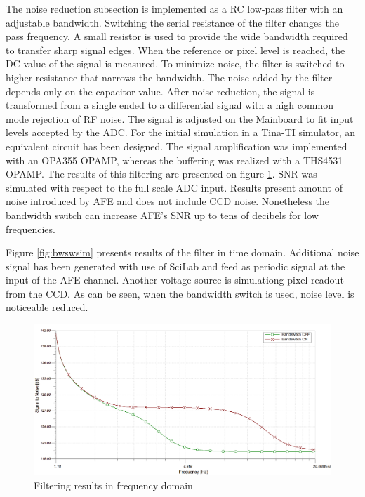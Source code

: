 The noise reduction subsection is implemented as a RC low-pass filter with an adjustable bandwidth. Switching the serial resistance of the filter changes the pass frequency. A small resistor is used to provide the wide bandwidth required to transfer sharp signal edges. When the reference or pixel level is reached, the DC value of the signal is measured. To minimize noise, the filter is switched to higher resistance that narrows the bandwidth. The noise added by the filter depends only on the capacitor value. 
After noise reduction, the signal is transformed from a single ended to a differential signal with a high common mode rejection of RF noise. The signal is adjusted on the Mainboard to fit input levels accepted by the ADC.
For the initial simulation in a Tina-TI simulator, an equivalent circuit has been designed. The signal amplification was implemented with an OPA355 OPAMP, whereas the buffering was realized with a THS4531 OPAMP. The results of this filtering are presented on figure \ref{fig:noise}. SNR was simulated with respect to the full scale ADC input. Results present amount of noise introduced by AFE and does not include CCD noise. Nonetheless the bandwidth switch can increase AFE's SNR up to tens of decibels for low frequencies. 

Figure \ref{fig:bwswsim} presents results of the filter in time domain. Additional noise signal has been generated with use of SciLab and feed as periodic signal at the input of the AFE channel. Another voltage source is simulationg pixel readout from the CCD. As can be seen, when the bandwidth switch is used, noise level is noticeable reduced.

\begin{figure}[H]
\centering
\includegraphics[width=\textwidth]{pict/snrsim.png}
\caption{Filtering results in frequency domain}
\label{fig:noise}
\end{figure}


